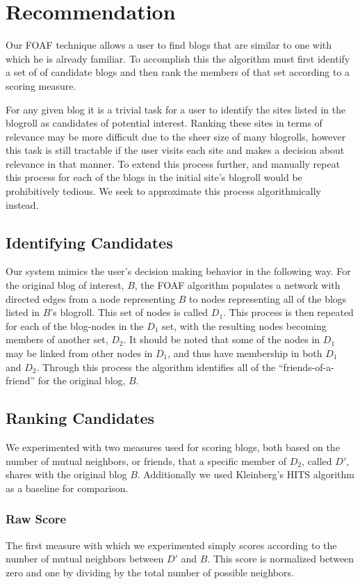 \documentclass{sig-alternate}
\begin{document}
\section{Recommendation}
Our FOAF technique allows a user to find blogs that are similar to one
with which he is already familiar.  To accomplish this the algorithm
must first identify a set of of candidate blogs and then rank the
members of that set according to a scoring measure.

For any given blog it is a trivial task for a user to identify the sites
listed in the blogroll as candidates of potential interest.  Ranking
these sites in terms of relevance may be more difficult due to the
sheer size of many blogrolls, however this task is still tractable if
the user visits each site and makes a decision about relevance in that
manner.  To extend this process further, and manually repeat this process for 
each of the blogs in the initial site's blogroll would be prohibitively tedious.  We seek to approximate this process
algorithmically instead.

\subsection{Identifying Candidates}
Our system mimics the user's decision making behavior in the following
way.  For the original blog of interest, $B$, the FOAF algorithm
populates a network with directed edges from a node representing $B$ to
nodes representing all of the blogs listed in $B$'s blogroll.  This set
of nodes is called $D_1$.  This process is then repeated for each of the
blog-nodes in the $D_1$ set, with the resulting nodes becoming members
of another set, $D_2$.  It should be noted that some of the nodes in $D_1$
may be linked from other nodes in $D_1$, and thus have membership in
both $D_1$ and $D_2$.  Through this process the algorithm identifies all of
the ``friends-of-a-friend'' for the original blog, $B$.

\subsection{Ranking Candidates}
We experimented with two measures used for scoring blogs, both based
on the number of mutual neighbors, or friends, that a specific member
of $D_2$, called $D'$, shares with the original blog $B$.  Additionally we 
used Kleinberg's HITS algorithm as a baseline for comparison.

\subsubsection{Raw Score}
The first  measure with which we experimented  simply scores according
to the  number of mutual  neighbors between $D'$  and $B$.  This  score is
normalized between zero and one by dividing by the total number
of possible neighbors.
\end{document}
